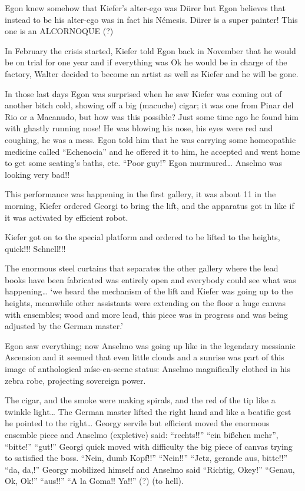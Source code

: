 \documentclass[smalldemyvopaper,11pt,twoside,onecolumn,openright,extrafontsizes]{memoir}
\begin{document}
Egon knew somehow that Kiefer’s alter-ego was Dürer but Egon believes that instead to be his alter-ego was in fact his Némesis. Dürer is a super painter! This one is an ALCORNOQUE (?)

In February the crisis started, Kiefer told Egon back in November that he would be on trial for one year and if everything was Ok he would be in charge of the factory, Walter decided to become an artist as well as Kiefer and he will be gone.

In those last days Egon was surprised when he saw Kiefer was coming out of another bitch cold, showing off a big (macuche) cigar; it was one from Pinar del Rio or a Macanudo, but how was this possible? Just some time ago he found him with ghastly running nose! He was blowing his nose, his eyes were red and coughing, he was a mess. Egon told him that he was carrying some homeopathic medicine called “Echenocia” and he offered it to him, he accepted and went home to get some seating’s baths, etc. “Poor guy!” Egon murmured… Anselmo was looking very bad!! 

\ornamentbreak

This performance was happening in the first gallery, it was about 11 in the morning, Kiefer ordered Georgi to bring the lift, and the apparatus got in like if it was activated by efficient robot.

Kiefer got on to the special platform and ordered to be lifted to the heights, quick!!! Schnell!!!

The enormous steel curtains that separates the other gallery where the lead books have been fabricated was entirely open and everybody could see what was happening… ‘we heard the mechanism of the lift and Kiefer was going up to the heights, meanwhile other assistants were extending on the floor a huge canvas with ensembles; wood and more lead, this piece was in progress and was being adjusted by the German master.’

Egon saw everything; now Anselmo was going up like in the legendary messianic Ascension and it seemed that even little clouds and a sunrise was part of this image of anthological míse-en-scene status: Anselmo magnifically clothed in his zebra robe, projecting sovereign power.

The cigar, and the smoke were making spirals, and the red of the tip like a twinkle light… The German master lifted the right hand and like a beatific gest he pointed to the right… Georgy servile but efficient moved the enormous ensemble piece and Anselmo (expletive) said: “rechts!!” “ein bißchen mehr”, “bitte!” “gut!” Georgi quick moved with difficulty the big piece of canvas trying to satisfied the boss. “Nein, dumb Kopf!!” “Nein!!” “Jetz, gerande aus, bitte!!” “da, da,!” Georgy mobilized himself and Anselmo said “Richtig, Okey!” “Genau, Ok, Ok!” “aus!!” “A la Goma!! Ya!!” (?) (to hell).
\end{document}
